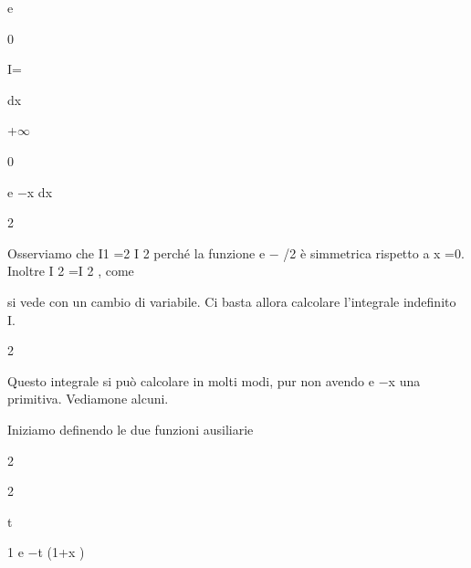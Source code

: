 \documentclass[a4paper,portrait,12pt]{article}
\begin{document}
\begin{flushleft}
e
\end{flushleft}





0





\begin{flushleft}
I=
\end{flushleft}





\begin{flushleft}
dx
\end{flushleft}





+$\infty$


0





\begin{flushleft}
e $-$x dx
\end{flushleft}


2





\begin{flushleft}
Osserviamo che I1 =2 I 2 perch\'{e} la funzione e $-$ /2 \`{e} simmetrica rispetto a x =0. Inoltre I 2 =I 2 , come
\end{flushleft}


\begin{flushleft}
si vede con un cambio di variabile. Ci basta allora calcolare l'integrale indefinito I.
\end{flushleft}


2


\begin{flushleft}
Questo integrale si pu\`{o} calcolare in molti modi, pur non avendo e $-$x una primitiva. Vediamone alcuni.
\end{flushleft}


\begin{flushleft}
Iniziamo definendo le due funzioni ausiliarie
\end{flushleft}


2


2


\begin{flushleft}
t
\end{flushleft}


\begin{flushleft}
1 e $-$t (1+x )
\end{flushleft}
\end{document}
